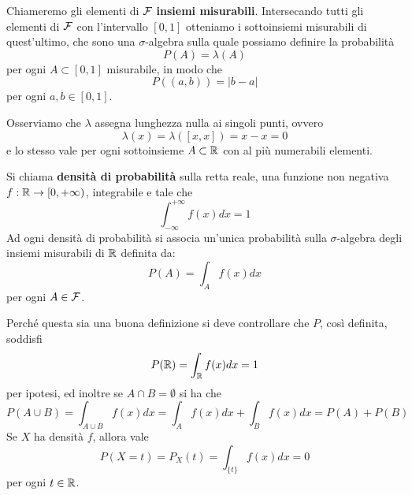 Chiameremo gli elementi di $\mathcal{F}$ \textbf{insiemi misurabili}. Intersecando tutti gli elementi di
$\mathcal{F}$ con l'intervallo $[0,1]$ otteniamo i sottoinsiemi misurabili di quest'ultimo, che sono una
$\sigma$-algebra sulla quale possiamo definire la probabilità
\[ P (A) = \lambda (A) \]
per ogni $A \subset [0,1]$ misurabile, in modo che
\[ P((a, b)) = |b - a| \]
per ogni $a,b \in [0,1]$.

\begin{observation}
	Osserviamo che $\lambda$ assegna lunghezza nulla ai singoli punti, ovvero
	\[ \lambda(x) = \lambda([x,x]) = x - x = 0 \]
	e lo stesso vale per ogni sottoinsieme $A \subset \mathbb{R}$ con al più numerabili elementi.
\end{observation}

\begin{definition}
	Si chiama \textbf{densità di probabilità} sulla retta reale, una funzione non negativa
	$f : \mathbb{R} \to [0, +\infty)$, integrabile e tale che
	\[ \int_{-\infty}^{+\infty} f(x) dx = 1 \]
	Ad ogni densità di probabilità si associa un'unica probabilità sulla $\sigma$-algebra degli
	insiemi misurabili di $\mathbb{R}$ definita da:
	\[ P(A) = \int_A f(x) dx \]
	per ogni $A \in \mathcal{F}$.
\end{definition}

Perché questa sia una buona definizione si deve controllare che $P$, così definita, soddisfi
\[ P(\mathbb{R}) = \int_{\mathbb{R}} f(x) dx = 1 \]
per ipotesi, ed inoltre se $A \cap B = \emptyset$ si ha che
\[ P(A \cup B) = \int_{A \cup B} f(x) dx = \int_A f(x) dx + \int_B f(x) dx = P(A) + P(B) \]
Se $X$ ha densità $f$, allora vale
\[ P(X = t) = P_X (t) = \int_{\{t\}} f(x) dx = 0 \]
per ogni $t \in \mathbb{R}$.